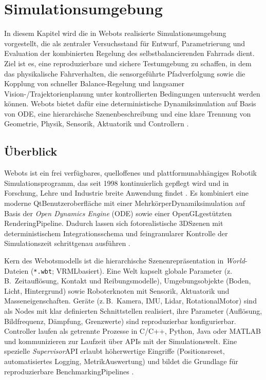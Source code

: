 \newpage
\section{Simulationsumgebung}
  In diesem Kapitel wird die in Webots realisierte Simulationsumgebung vorgestellt, die als zentraler Versuchsstand für Entwurf, Parametrierung
  und Evaluation der kombinierten Regelung des selbstbalancierenden Fahrrads dient. Ziel ist es, eine reproduzierbare und sichere  
  Testumgebung zu schaffen, in dem das physikalische Fahrverhalten, die sensorgeführte Pfadverfolgung sowie die Kopplung von schneller
  Balance-Regelung und langsamer Vision-/Trajektorienplanung unter kontrollierten Bedingungen untersucht werden können. Webots
  bietet dafür eine deterministische Dynamiksimulation auf Basis von ODE, eine hierarchische Szenenbeschreibung und eine klare
  Trennung von Geometrie, Physik, Sensorik, Aktuatorik und Controllern \citep{cyberbotics2025}.


  \subsection{Überblick}
  Webots ist ein frei verfügbares, quelloffenes und plattformunabhängiges Robotik Simulationsprogramm, das seit 1998 kontinuierlich 
  gepflegt wird und in Forschung, Lehre und Industrie breite Anwendung findet \citep{michel2004,cyberbotics2025}. Es kombiniert eine 
  moderne Qt\-Benutzeroberfläche mit einer Mehrkörper\-Dynamiksimulation auf Basis der \emph{Open Dynamics Engine} (ODE) sowie einer 
  OpenGL\-gestützten Rendering\-Pipeline. Dadurch lassen sich fotorealistische 3D\-Szenen mit deterministischem Integrationsschema und 
  feingranularer Kontrolle der Simulationszeit schrittgenau ausführen \citep{cyberbotics2025}.

  Kern des Webotsmodells ist die hierarchische Szenenrepräsentation in \textit{World}-Dateien 
  (\texttt{*.wbt}; VRML\-basiert). 
  Eine Welt kapselt globale Parameter (z.\,B.\ Zeitauflösung, Kontakt\- und Reibungsmodelle), Umgebungsobjekte (Boden, Licht, Hintergrund) 
  sowie Roboterknoten mit Sensorik, Aktuatorik und Masseneigenschaften. Geräte (z.\,B.\ Kamera, IMU, Lidar, RotationalMotor) 
  sind als Nodes mit klar definierten Schnittstellen realisiert, ihre Parameter (Auflösung, Bildfrequenz, Dämpfung, Grenzwerte) sind 
  reproduzierbar konfigurierbar. Controller laufen als getrennte Prozesse in C/C++, Python, Java oder MATLAB und kommunizieren zur Laufzeit 
  über APIs mit der Simulationswelt\citep{cyberbotics2025}. Eine spezielle \emph{Supervisor}\-API erlaubt höherwertige Eingriffe (Positionsreset, automatisiertes 
  Logging, Metrik\-Auswertung) und bildet die Grundlage für reproduzierbare Benchmarking\-Pipelines \citep{cyberbotics2025}.

